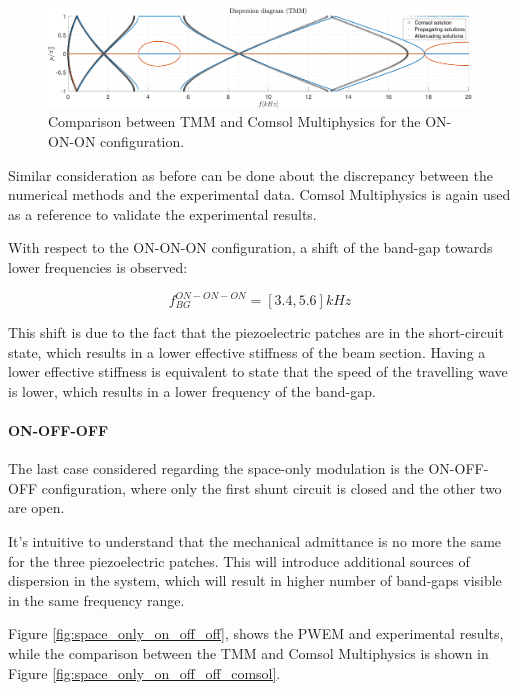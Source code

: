 \begin{figure}[H]
    \centering
    \includegraphics[width=\textwidth]{./img/MATLAB/TMM_COMSOL ON-ON-ON @0kHz.pdf}
    \caption{Comparison between TMM and Comsol Multiphysics for the ON-ON-ON configuration.}
    \label{fig:space_only_on_on_on_comsol}
\end{figure}

Similar consideration as before can be done about the discrepancy between the numerical methods and the experimental data.
Comsol Multiphysics is again used as a reference to validate the experimental results.

With respect to the ON-ON-ON configuration, a shift of the band-gap towards lower frequencies is observed:

\begin{equation}
    f_{BG}^{ON-ON-ON} = [3.4, 5.6] kHz
\end{equation}

This shift is due to the fact that the piezoelectric patches are in the short-circuit state, which results in a lower effective stiffness of the beam section.
Having a lower effective stiffness is equivalent to state that the speed of the travelling wave is lower, which results in a lower frequency of the band-gap.



\paragraph{ON-OFF-OFF}

The last case considered regarding the space-only modulation is the ON-OFF-OFF configuration, where only the first shunt circuit is closed and the other two are open.

It's intuitive to understand that the mechanical admittance is no more the same for the three piezoelectric patches.
This will introduce additional sources of dispersion in the system, which will result in higher number of band-gaps visible in the same frequency range.

Figure \ref{fig:space_only_on_off_off}, shows the PWEM and experimental results, while the comparison between the TMM and Comsol Multiphysics is shown in Figure \ref{fig:space_only_on_off_off_comsol}.

